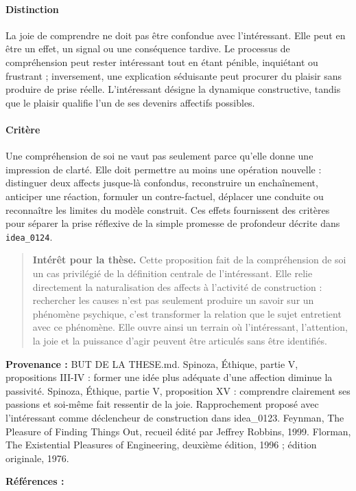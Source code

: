 \documentclass[10pt,a4paper]{article}
\begin{document}
\paragraph{Distinction}
La joie de comprendre ne doit pas être confondue avec l'intéressant. Elle peut en être un effet, un signal ou une conséquence tardive. Le processus de compréhension peut rester intéressant tout en étant pénible, inquiétant ou frustrant ; inversement, une explication séduisante peut procurer du plaisir sans produire de prise réelle. L'intéressant désigne la dynamique constructive, tandis que le plaisir qualifie l'un de ses devenirs affectifs possibles.

\paragraph{Critère}
Une compréhension de soi ne vaut pas seulement parce qu'elle donne une impression de clarté. Elle doit permettre au moins une opération nouvelle : distinguer deux affects jusque-là confondus, reconstruire un enchaînement, anticiper une réaction, formuler un contre-factuel, déplacer une conduite ou reconnaître les limites du modèle construit. Ces effets fournissent des critères pour séparer la prise réflexive de la simple promesse de profondeur décrite dans \texttt{idea\_0124}.

\begin{quote}
\textbf{Intérêt pour la thèse.} Cette proposition fait de la compréhension de soi un cas privilégié de la définition centrale de l'intéressant. Elle relie directement la naturalisation des affects à l'activité de construction : rechercher les causes n'est pas seulement produire un savoir sur un phénomène psychique, c'est transformer la relation que le sujet entretient avec ce phénomène. Elle ouvre ainsi un terrain où l'intéressant, l'attention, la joie et la puissance d'agir peuvent être articulés sans être identifiés.
\end{quote}
{\footnotesize\color{metadata}\textbf{Provenance :} BUT DE LA THESE.md. Spinoza, Éthique, partie V, propositions III-IV : former une idée plus adéquate d'une affection diminue la passivité. Spinoza, Éthique, partie V, proposition XV : comprendre clairement ses passions et soi-même fait ressentir de la joie. Rapprochement proposé avec l'intéressant comme déclencheur de construction dans idea\_0123. Feynman, The Pleasure of Finding Things Out, recueil édité par Jeffrey Robbins, 1999. Florman, The Existential Pleasures of Engineering, deuxième édition, 1996 ; édition originale, 1976.\par}
{\footnotesize\color{metadata}\textbf{Références :} \parencite{spinoza1861oeuvres,macherey1995vieaffective,feynman1999pleasure,florman1996existential}\par}
\end{document}

